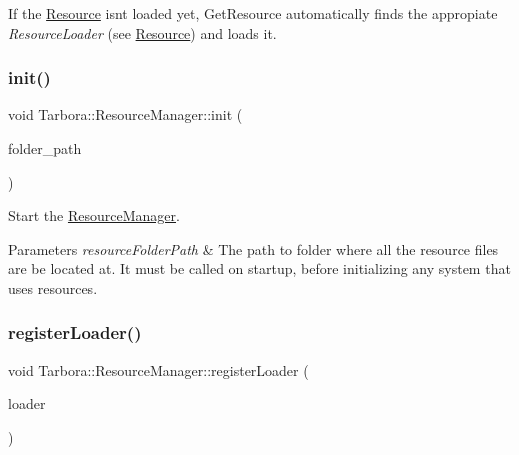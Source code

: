 If the \hyperlink{classTarbora_1_1Resource}{Resource} isn\textquotesingle{}t loaded yet, Get\+Resource automatically finds the appropiate {\itshape Resource\+Loader} (see \hyperlink{classTarbora_1_1Resource}{Resource}) and loads it. \mbox{\label{classTarbora_1_1ResourceManager_a83f6083aa9a2c8331a0fd519b7d9f62d}} 
\subsubsection{\texorpdfstring{init()}{init()}}
{\footnotesize\ttfamily void Tarbora\+::\+Resource\+Manager\+::init (\begin{DoxyParamCaption}\item[{const std\+::string \&}]{folder\+\_\+path }\end{DoxyParamCaption})\hspace{0.3cm}{\ttfamily [static]}}



Start the \hyperlink{classTarbora_1_1ResourceManager}{Resource\+Manager}. 


\begin{DoxyParams}{Parameters}
{\em resource\+Folder\+Path} & The path to folder where all the resource files are be located at. It must be called on startup, before initializing any system that uses resources. \\
\hline
\end{DoxyParams}
\mbox{\label{classTarbora_1_1ResourceManager_a16851fa61eb7b4c3db0d079ddb295080}} 
\subsubsection{\texorpdfstring{register\+Loader()}{registerLoader()}}
{\footnotesize\ttfamily void Tarbora\+::\+Resource\+Manager\+::register\+Loader (\begin{DoxyParamCaption}\item[{std\+::shared\+\_\+ptr$<$ Resource\+Loader $>$}]{loader }\end{DoxyParamCaption})\hspace{0.3cm}{\ttfamily [static]}}



